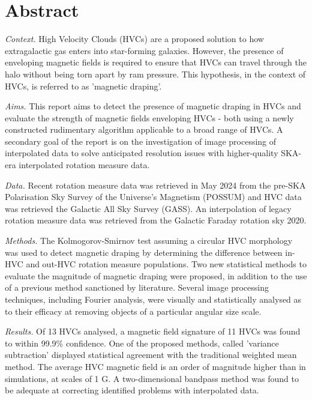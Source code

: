 \chapter*{Abstract}

\noindent\textit{Context.} High Velocity Clouds (HVCs) are a proposed solution to how extragalactic gas enters into star-forming galaxies. However, the presence of enveloping magnetic fields is required to ensure that HVCs can travel through the halo without being torn apart by ram pressure. This hypothesis, in the context of HVCs, is referred to as 'magnetic draping'.

\noindent\textit{Aims.} This report aims to detect the presence of magnetic draping in HVCs and evaluate the strength of magnetic fields enveloping HVCs - both using a newly constructed rudimentary algorithm applicable to a broad range of HVCs. A secondary goal of the report is on the investigation of image processing of interpolated data to solve anticipated resolution issues with higher-quality SKA-era interpolated rotation measure data.

\noindent\textit{Data.} Recent rotation measure data was retrieved in May 2024 from the pre-SKA Polarisation Sky Survey of the Universe's Magnetism (POSSUM) and HVC data was retrieved the Galactic All Sky Survey (GASS). An interpolation of legacy rotation measure data was retrieved from the Galactic Faraday rotation sky 2020.

\noindent\textit{Methods.} The Kolmogorov-Smirnov test assuming a circular HVC morphology was used to detect magnetic draping by determining the difference between in-HVC and out-HVC rotation measure populations. Two new statistical methods to evaluate the magnitude of magnetic draping were proposed, in addition to the use of a previous method sanctioned by literature. Several image processing techniques, including Fourier analysis, were visually and statistically analysed as to their efficacy at removing objects of a particular angular size scale.

\noindent\textit{Results.} Of 13 HVCs analysed, a magnetic field signature of 11 HVCs was found to within 99.9\% confidence. One of the proposed methods, called 'variance subtraction' displayed statistical agreement with the traditional weighted mean method. The average HVC magnetic field is an order of magnitude higher than in simulations, at scales of 1 \textmu G. A two-dimensional bandpass method was found to be adequate at correcting identified problems with interpolated data.


